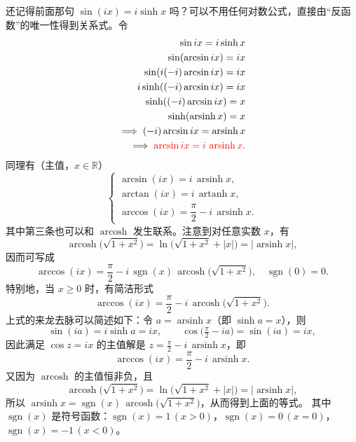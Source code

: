 \documentclass[lang=cn,newtx,10pt,scheme=chinese]{elegantbook}
\DeclareMathOperator{\arsinh}{arsinh}
\DeclareMathOperator{\arcosh}{arcosh}
\DeclareMathOperator{\artanh}{artanh}
\begin{document}
\begin{example}
  还记得前面那句 $\sin(ix)=i\sinh x$ 吗？可以不用任何对数公式，直接由“反函数”的唯一性得到关系式。令
  \begin{equation}
    \begin{aligned}
    \sin i x= i \sinh x \\
    \sin (\arcsin ix)=ix\\
    \sin(i(-i)\arcsin ix)=ix\\
    i \sinh ((-i)\arcsin ix)=i x\\
    \sinh ((-i)\arcsin ix)=x\\
    \sinh(\arsinh x)=x\\
    \implies (-i)\arcsin ix=\arsinh x\\
    \implies \textcolor{red}{\arcsin ix=i\,\arsinh x.}
    \end{aligned}
  \end{equation}
  同理有（主值，$x\in\mathbb{R}$）
  \begin{equation}
    \begin{cases}
      \arcsin (i x)= i\,\arsinh x, \\
      \arctan (i x)= i\,\artanh x, \\
      \arccos (i x)= \dfrac{\pi}{2} - i\,\arsinh x.
    \end{cases}
  \end{equation}
  其中第三条也可以和 $\arcosh$ 发生联系。注意到对任意实数 $x$，有
  \begin{equation*}
    \arcosh\!\big(\sqrt{1+x^{2}}\big) = \ln\!\big(\sqrt{1+x^{2}}+|x|\big) = |\arsinh x|,
  \end{equation*}
  因而可写成
  \begin{equation*}
    \arccos(i x)=\frac{\pi}{2}- i\,\operatorname{sgn}(x)\,\arcosh\!\big(\sqrt{1+x^{2}}\big),\quad \operatorname{sgn}(0)=0.
  \end{equation*}
  特别地，当 $x\ge 0$ 时，有简洁形式
  \begin{equation*}
    \arccos(i x)=\frac{\pi}{2}- i\,\arcosh\!\big(\sqrt{1+x^{2}}\big).
  \end{equation*}
  上式的来龙去脉可以简述如下：令 $a=\arsinh x$（即 $\sinh a=x$），则
  \begin{equation*}
    \sin(i a)=i\sinh a=i x,\qquad \cos\Big(\tfrac{\pi}{2}-i a\Big)=\sin(i a)=i x,
  \end{equation*}
  因此满足 $\cos z=i x$ 的主值解是 $z=\tfrac{\pi}{2}-i\,\arsinh x$，即
  \begin{equation*}
    \arccos(i x)=\frac{\pi}{2}- i\,\arsinh x.
  \end{equation*}
  又因为 $\arcosh$ 的主值恒非负，且
  \begin{equation*}
    \arcosh\!\big(\sqrt{1+x^{2}}\big)=\ln\!\big(\sqrt{1+x^{2}}+|x|\big)=|\arsinh x|,
  \end{equation*}
  所以 $\arsinh x=\operatorname{sgn}(x)\,\arcosh\!\big(\sqrt{1+x^{2}}\big)$，从而得到上面的等式。
  其中 $\operatorname{sgn}(x)$ 是符号函数：$\operatorname{sgn}(x)=1\,(x>0)$，$\operatorname{sgn}(x)=0\,(x=0)$，$\operatorname{sgn}(x)=-1\,(x<0)$。
  

\end{example}
\end{document}
